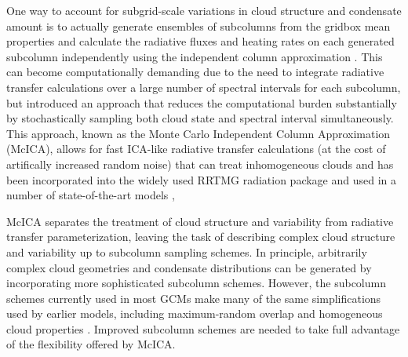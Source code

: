 \documentclass[letter]{article}
\begin{document}
One way to account for subgrid-scale variations in cloud structure and condensate amount is to actually generate ensembles of subcolumns from the gridbox mean properties and calculate the radiative fluxes and heating rates on each generated subcolumn independently using the independent column approximation \citep[ICA;][]{cahalan_et_al_1994}. This can become computationally demanding due to the need to integrate radiative transfer calculations over a large number of spectral intervals for each subcolumn, but \cite{pincus_et_al_2003} introduced an approach that reduces the computational burden substantially by stochastically sampling both cloud state and spectral interval simultaneously. This approach, known as the Monte Carlo Independent Column Approximation (McICA), allows for fast ICA-like radiative transfer calculations (at the cost of artifically increased random noise) that can treat inhomogeneous clouds and has been incorporated into the widely used RRTMG radiation package and used in a number of state-of-the-art models \citep{iacono_et_al_2008,von_salzen_et_al_2012,cam4_description,cam5_description,donner_et_al_2011,navgem_description},

McICA separates the treatment of cloud structure and variability from radiative transfer parameterization, leaving the task of describing complex cloud structure and variability up to subcolumn sampling schemes. In principle, arbitrarily complex cloud geometries and condensate distributions can be generated by incorporating more sophisticated subcolumn schemes. However, the subcolumn schemes currently used in most GCMs make many of the same simplifications used by earlier models, including maximum-random overlap and homogeneous cloud properties \citep[e.g.,][]{cam4_description,cam5_description}. Improved subcolumn schemes are needed to take full advantage of the flexibility offered by McICA.
\end{document}
